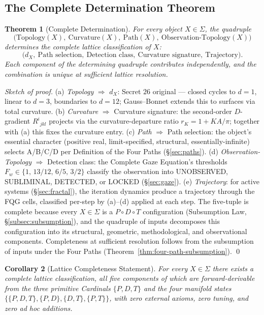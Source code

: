 \documentclass[11pt,a4paper]{article}
\newtheorem{theorem}{Theorem}[section]
\newtheorem{corollary}[theorem]{Corollary}
\theoremstyle{definition}
\theoremstyle{remark}
\begin{document}
\subsection{The Complete Determination Theorem}

\begin{theorem}[Complete Determination]\label{thm:secret26}
For every object $X\in\Sigma$, the quadruple
\[
\bigl(\text{Topology}(X),\ \text{Curvature}(X),\ \text{Path}(X),\ \text{Observation-Topology}(X)\bigr)
\]
determines the complete lattice classification of $X$:
\[
\bigl(d_{X},\ \text{Path selection},\ \text{Detection class},\ \text{Curvature signature},\ \text{Trajectory}\bigr).
\]
Each component of the determining quadruple contributes independently, and the combination is unique at sufficient lattice resolution.
\end{theorem}

\begin{proof}[Sketch of proof]
(a) \emph{Topology} $\Rightarrow$ $d_{X}$: Secret $26$ original --- closed cycles to $d=1$, linear to $d=3$, boundaries to $d=12$; Gauss--Bonnet extends this to surfaces via total curvature. (b) \emph{Curvature} $\Rightarrow$ Curvature signature: the second-order $D$-gradient $R^{i}{}_{jkl}$ projects via the curvature-departure ratio $r_{K} = 1 + KA/\pi$; together with (a) this fixes the curvature entry. (c) \emph{Path} $\Rightarrow$ Path selection: the object's essential character (positive real, limit-specified, structural, essentially-infinite) selects A/B/C/D per Definition of the Four Paths (\S\ref{sec:paths}). (d) \emph{Observation-Topology} $\Rightarrow$ Detection class: the Complete Gaze Equation's thresholds $F_{w} \in \{1,\,13/12,\,6/5,\,3/2\}$ classify the observation into UNOBSERVED, SUBLIMINAL, DETECTED, or LOCKED (\S\ref{sec:gaze}). (e) \emph{Trajectory}: for active systems (\S\ref{sec:fractal}), the iteration dynamics produce a trajectory through the FQG cells, classified per-step by (a)--(d) applied at each step. The five-tuple is complete because every $X\in\Sigma$ is a $P\circ D\circ T$ configuration (Subsumption Law, \S\ref{subsec:subsumption}), and the quadruple of inputs decomposes this configuration into its structural, geometric, methodological, and observational components. Completeness at sufficient resolution follows from the subsumption of inputs under the Four Paths (Theorem~\ref{thm:four-path-subsumption}).
\qed
\end{proof}

\begin{corollary}[Lattice Completeness Statement]\label{cor:completeness}
For every $X\in\Sigma$ there exists a complete lattice classification, all five components of which are forward-derivable from the three primitive Cardinals $\{P,D,T\}$ and the four manifold states $\{\{P,D,T\}, \{P,D\}, \{D,T\}, \{P,T\}\}$, with zero external axioms, zero tuning, and zero ad hoc additions.
\end{corollary}
\end{document}
